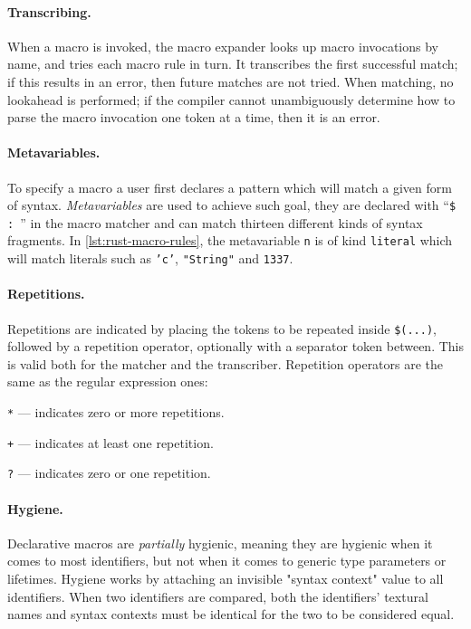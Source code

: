 \paragraph{Transcribing.}%
When a macro is invoked, the macro expander looks up macro invocations by name, and tries each macro rule in turn.
It transcribes the first successful match; if this results in an error,
then future matches are not tried. When matching, no lookahead is performed;
if the compiler cannot unambiguously determine how to parse the macro invocation one token at a time, then it is an error.

\paragraph{Metavariables.}%
To specify a macro a user first declares a pattern which will match a given form of syntax.
\emph{Metavariables} are used to achieve such goal,
they are declared with “\texttt{\$  : }” in the macro matcher and
can match thirteen different kinds of syntax fragments.
In \autoref{lst:rust-macro-rules}, the metavariable \texttt{n} is of kind \texttt{literal}
which will match literals such as \texttt{'c'}, \texttt{"String"} and \texttt{1337}.

\paragraph{Repetitions.}%
Repetitions are indicated by placing the tokens to be repeated inside \texttt{\$(...)},
followed by a repetition operator, optionally with a separator token between.
This is valid both for the matcher and the transcriber.
Repetition operators are the same as the regular expression ones:
\begin{compactitem}
    \item \texttt{*} — indicates zero or more repetitions.
    \item \texttt{+} — indicates at least one repetition.
    \item \texttt{?} — indicates zero or one repetition.
\end{compactitem}

\paragraph{Hygiene.}%
Declarative macros are \emph{partially} hygienic, meaning they are hygienic when it comes to most identifiers,
but not when it comes to generic type parameters or lifetimes.
Hygiene works by attaching an invisible "syntax context" value to all identifiers. When two identifiers are compared,
both the identifiers' textural names and syntax contexts must be identical for the two to be considered equal.

